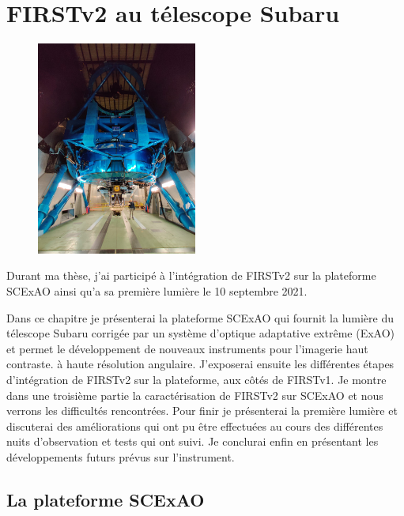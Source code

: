\chapter{FIRSTv2 au télescope Subaru}
\label{sec:FIRSTv2Subaru}
\setcounter{figure}{0}
\setcounter{table}{0}
\setcounter{equation}{0}

\minitoc

\begin{figure}[ht!]
    \centering
    \includegraphics[width=0.47\textwidth]{Figure_Chap5/20200121_999996.jpeg}
\end{figure}

\clearpage
Durant ma thèse, j'ai participé à l'intégration de \ac{FIRSTv2} sur la plateforme \ac{SCExAO} ainsi qu'a sa première lumière le 10 septembre 2021.

Dans ce chapitre je présenterai la plateforme \ac{SCExAO} qui fournit la lumière du télescope Subaru corrigée par un système d'optique adaptative extrême (\ac{ExAO}) et permet le développement de nouveaux instruments pour l'imagerie haut contraste. à haute résolution angulaire. J'exposerai ensuite les différentes étapes d'intégration de \ac{FIRSTv2} sur la plateforme, aux côtés de \ac{FIRSTv1}. Je montre dans une troisième partie la caractérisation de \ac{FIRSTv2} sur \ac{SCExAO} et nous verrons les difficultés rencontrées. Pour finir je présenterai la première lumière et discuterai des améliorations qui ont pu être effectuées au cours des différentes nuits d'observation et tests qui ont suivi. Je conclurai enfin en présentant les développements futurs prévus sur l'instrument.


\section{La plateforme SCExAO}

